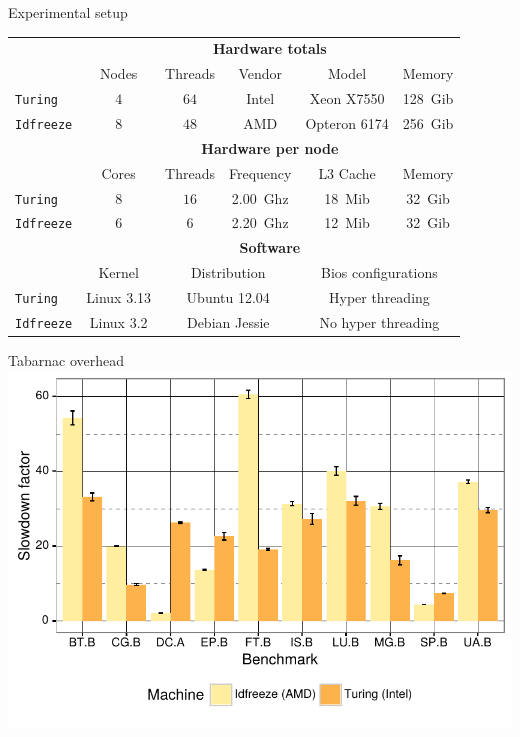 \documentclass[xcolor={usenames,dvipsnames},hyperref={pdfusetitle}]{beamer}
\begin{document}
\setcounter{framenumber}{\value{finalframe}}
\begin{frame}{Experimental setup}
    \small
    \centering
    \begin{tabular}{lccccc}
        \toprule
        & \multicolumn{5}{c}{\textbf{Hardware totals}}\\
        \cmidrule(lr){2-6}
        & Nodes & Threads & Vendor & Model & Memory \\
        \cmidrule(lr){2-6}
        \texttt{Turing}   & $4$ & $64$ & Intel & Xeon X7550   & \SI{128}{Gib} \\
        \texttt{Idfreeze} & $8$ & $48$ & AMD   & Opteron 6174 & \SI{256}{Gib}\\
        \midrule
        & \multicolumn{5}{c}{\textbf{Hardware per node}}\\
        \cmidrule(lr){2-6}
        & Cores & Threads & Frequency & L3 Cache & Memory \\
        \cmidrule(lr){2-6}
        \texttt{Turing}   & $8$ & $16$ & \SI{2.00}{Ghz}& \SI{18}{Mib} & \SI{32}{Gib} \\
        \texttt{Idfreeze} & $6$ & $6$  & \SI{2.20}{Ghz}& \SI{12}{Mib} & \SI{32}{Gib}\\
        \midrule
        & \multicolumn{5}{c}{\textbf{Software}}\\
        \cmidrule(lr){2-6}
        & Kernel & \multicolumn{2}{c}{Distribution} &
        \multicolumn{2}{c}{Bios configurations} \\
        \cmidrule(lr){2-6}
        \texttt{Turing}   & Linux 3.13 & \multicolumn{2}{c}{Ubuntu 12.04} &
        \multicolumn{2}{c}{Hyper threading} \\
        \texttt{Idfreeze} & Linux 3.2 & \multicolumn{2}{c}{Debian Jessie} &
        \multicolumn{2}{c}{No hyper threading}\\
        \bottomrule
    \end{tabular}
\end{frame}

\setcounter{framenumber}{\value{finalframe}}
\begin{frame}{Tabarnac overhead}
    \includegraphics[width=\linewidth]{tabarnac/tool-ovh.pdf}
\end{frame}
\end{document}
